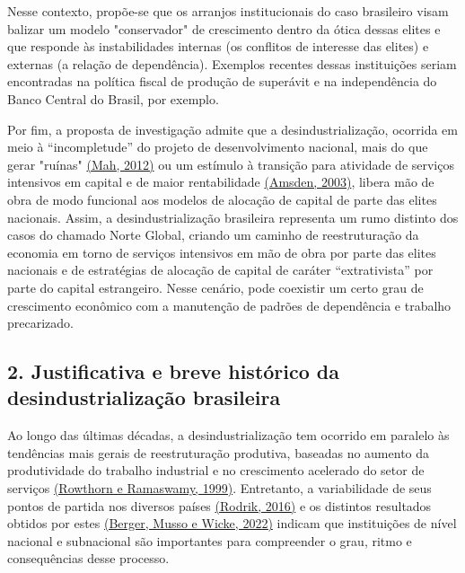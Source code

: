 Nesse contexto, propõe-se que os arranjos institucionais do caso
brasileiro visam balizar um modelo "conservador" de crescimento dentro
da ótica dessas elites e que responde às instabilidades internas (os
conflitos de interesse das elites) e externas (a relação de
dependência). Exemplos recentes dessas instituições seriam encontradas
na política fiscal de produção de superávit e na independência do Banco
Central do Brasil, por exemplo.

Por fim, a proposta de investigação admite que a desindustrialização,
ocorrida em meio à ``incompletude'' do projeto de desenvolvimento
nacional, mais do que gerar "ruínas"
\href{https://www.zotero.org/google-docs/?mViMNW}{(Mah, 2012)} ou um
estímulo à transição para atividade de serviços intensivos em capital e
de maior rentabilidade
\href{https://www.zotero.org/google-docs/?ISAuAT}{(Amsden, 2003)},
libera mão de obra de modo funcional aos modelos de alocação de capital
de parte das elites nacionais. Assim, a desindustrialização brasileira
representa um rumo distinto dos casos do chamado Norte Global, criando
um caminho de reestruturação da economia em torno de serviços intensivos
em mão de obra por parte das elites nacionais e de estratégias de
alocação de capital de caráter ``extrativista'' por parte do capital
estrangeiro. Nesse cenário, pode coexistir um certo grau de crescimento
econômico com a manutenção de padrões de dependência e trabalho
precarizado.

\subsection{\texorpdfstring{\textbf{2. Justificativa e breve histórico
da desindustrialização
brasileira}}{2. Justificativa e breve histórico da desindustrialização brasileira}}\label{justificativa-e-breve-histuxf3rico-da-desindustrializauxe7uxe3o-brasileira}

Ao longo das últimas décadas, a desindustrialização tem ocorrido em
paralelo às tendências mais gerais de reestruturação produtiva, baseadas
no aumento da produtividade do trabalho industrial e no crescimento
acelerado do setor de serviços
\href{https://www.zotero.org/google-docs/?KKpm5d}{(Rowthorn e Ramaswamy,
1999)}. Entretanto, a variabilidade de seus pontos de partida nos
diversos países
\href{https://www.zotero.org/google-docs/?8KG5nv}{(Rodrik, 2016)} e os
distintos resultados obtidos por estes
\href{https://www.zotero.org/google-docs/?3r6RHy}{(Berger, Musso e
Wicke, 2022)} indicam que instituições de nível nacional e subnacional
são importantes para compreender o grau, ritmo e consequências desse
processo.

